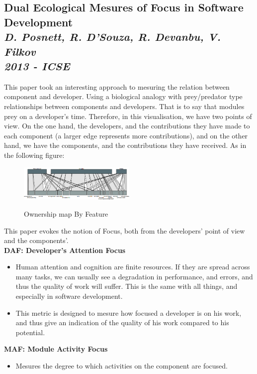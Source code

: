 \subsection{Dual Ecological Mesures of Focus in Software Development\\ \textit{D. Posnett, R. D’Souza, R. Devanbu, V. Filkov\\ 2013 - ICSE}}

This paper took an interesting approach to mesuring the relation between component and developer. Using a biological analogy with prey/predator type relationships between components and developers. That is to say that modules prey on a developer's time. Therefore, in this visualisation, we have two points of view. On the one hand, the developers, and the contributions they have made to each component (a larger edge represents more contributions), and on the other hand, we have the components, and the contributions they have received. As in the following figure:

\begin{figure}[H]
\centering
\includegraphics[width=0.5\textwidth]{./resources/focus.png}~
\caption{Ownership map By Feature}
\label{fig:ownership_map_by_feature}
\end{figure}

This paper evokes the notion of Focus, both from the developers' point of view and the components'.
\\[0.4cm]
\textbf{DAF: Developer’s Attention Focus}
\begin{itemize}
\item Human attention and cognition are finite resources. If they are spread across many tasks, we can usually see a degradation in performance, and errors, and thus the quality of work will suffer. This is the same with all things, and especially in software development.
\item This metric is designed to mesure how focused a developer is on his work, and thus give an indication of the quality of his work compared to his potential.
\end{itemize}

\textbf{MAF: Module Activity Focus}
\begin{itemize}
\item Mesures the degree to which activities on the component are focused.
\end{itemize}

